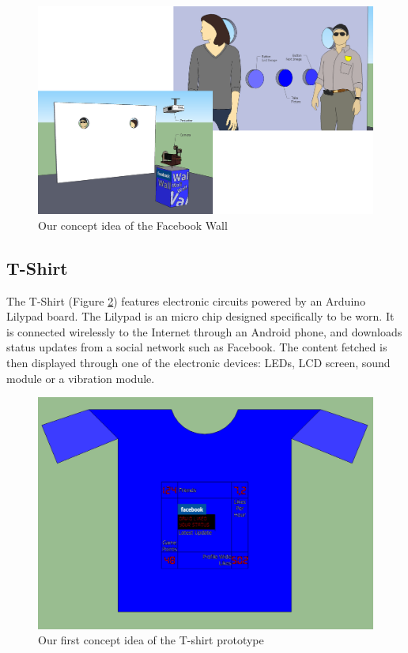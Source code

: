 \begin{figure}[h!]
\centering \includegraphics[scale=0.22]{img/prestudies-facebookwall}
\caption{Our concept idea of the Facebook Wall}
\label{fig:prestudies-facebookwall}
\end{figure}

\newpage

\subsection{T-Shirt}
The T-Shirt (Figure \ref{fig:prestudies-tshirt})  features electronic circuits powered by an Arduino Lilypad board.
The Lilypad is an micro chip designed specifically to be worn. It is connected wirelessly to the Internet through
an Android phone, and downloads status updates from a social network such as Facebook.
The content fetched is then displayed through one of the electronic devices: LEDs, LCD screen,
sound module or a vibration module.


\begin{figure}[h!]
\centering \includegraphics[scale=0.35]{img/prestudies-tshirt}
\caption{Our first concept idea of the T-shirt prototype}
\label{fig:prestudies-tshirt}
\end{figure}

